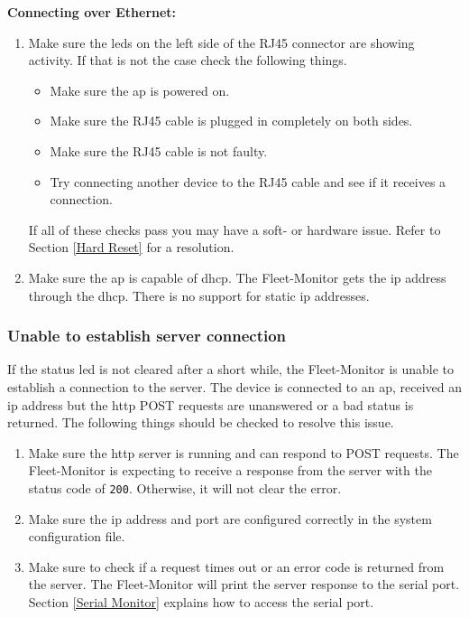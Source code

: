 \textbf{Connecting over Ethernet:}
\begin{enumerate}
  \item Make sure the \acrshort{led}s on the left side of the RJ45 connector are showing activity. If that is not the case check the following things.
  \begin{itemize}
      \item Make sure the \acrlong{ap} is powered on.
      \item Make sure the RJ45 cable is plugged in completely on both sides.
      \item Make sure the RJ45 cable is not faulty.
      \item Try connecting another device to the RJ45 cable and see if it receives a connection.
  \end{itemize}
  If all of these checks pass you may have a soft- or hardware issue. Refer to Section \ref{Hard Reset} for a resolution.
  \item Make sure the \acrlong{ap} is capable of \acrshort{dhcp}. The Fleet-Monitor gets the \acrshort{ip} address through the \acrlong{dhcp}. There is no support for static \acrshort{ip} addresses.
\end{enumerate}
\newpage

\subsubsection{Unable to establish server connection}\label{Unable to establish server connection}
If the status \acrshort{led} is not cleared after a short while, the Fleet-Monitor is unable to establish a connection to the server. The device is connected to an \acrshort{ap}, received an \acrshort{ip} address but the \acrshort{http} POST requests are unanswered or a bad status is returned. The following things should be checked to resolve this issue.

\begin{enumerate}
  \item Make sure the \acrshort{http} server is running and can respond to POST requests. The Fleet-Monitor is expecting to receive a response from the server with the status code of \texttt{200}. Otherwise, it will not clear the error.
  \item Make sure the \acrshort{ip} address and port are configured correctly in the system configuration file.
  \item Make sure to check if a request times out or an error code is returned from the server. The Fleet-Monitor will print the server response to the serial port. Section \ref{Serial Monitor} explains how to access the serial port.
\end{enumerate}

